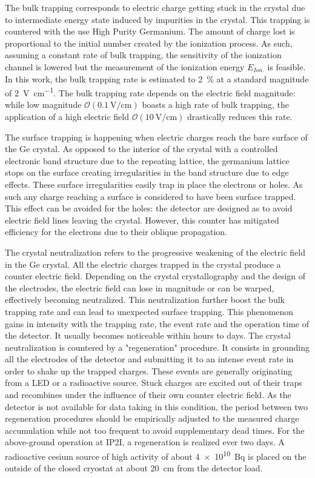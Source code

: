 The bulk trapping corresponds to electric charge getting stuck in the crystal due to intermediate energy state induced by impurities in the crystal. This trapping is countered with the use High Purity Germanium. The amount of charge lost is proportional to the initial number created by the ionization process. As such, assuming a constant rate of bulk trapping, the sensitivity of the ionization channel is lowered but the measurement of the ionization energy $E_{Ion.}$ is feasible. In this work, the bulk trapping rate is estimated to \SI{2}{\percent} at a standard magnitude of \SI{2}{\volt\per\cm}. The bulk trapping rate depends on the electric field magnitude: while low magnitude $\mathcal{O}(\SI{0.1}{\volt\per\cm})$ boasts a high rate of bulk trapping, the application of a high electric field $\mathcal{O}(\SI{10}{\volt\per\cm})$ drastically reduces this rate.

The surface trapping is happening when electric charges reach the bare surface of the Ge crystal. As opposed to the interior of the crystal with a controlled electronic band structure due to the repeating lattice, the germanium lattice stops on the surface creating irregularities in the band structure due to edge effects. These surface irregularities easily trap in place the electrons or holes. As such any charge reaching a surface is considered to have been surface trapped. This effect can be avoided for the holes: the detector are designed as to avoid electric field lines leaving the crystal. However, this counter has mitigated efficiency for the electrons due to their oblique propagation.

The crystal neutralization refers to the progressive weakening of the electric field in the Ge crystal. All the electric charges trapped in the crystal produce a counter electric field. Depending on the crystal crystallography and the design of the electrodes, the electric field can lose in magnitude or can be warped, effectively becoming neutralized. This neutralization further boost the bulk trapping rate and can lead to unexpected surface trapping.
This phenomenon gains in intensity with the trapping rate, the event rate and the operation time of the detector. It usually becomes noticeable within hours to days. The crystal neutralization is countered by a "regeneration" procedure. It consists in grounding all the electrodes of the detector and submitting it to an intense event rate in order to shake up the trapped charges. These events are generally originating from a LED or a radioactive source. Stuck charges are excited out of their traps and recombines under the influence of their own counter electric field. As the detector is not available for data taking in this condition, the period between two regeneration procedures should be empirically adjusted to the measured charge accumulation while not too frequent to avoid supplementary dead times. For the above-ground operation at IP2I, a regeneration is realized ever two days. A radioactive cesium source of high activity of about \SI{4e10}{\becquerel} is placed on the outside of the closed cryostat at about \SI{20}{\cm} from the detector load.

